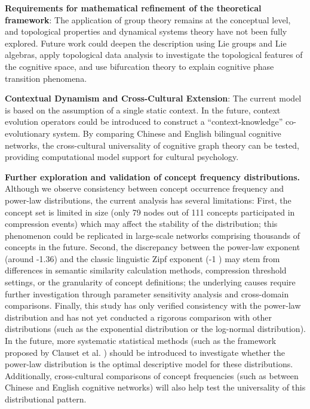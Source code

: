 \documentclass[10pt,onecolumn]{article}
\begin{document}
\textbf{Requirements for mathematical refinement of the theoretical framework}: The application of group theory remains at the conceptual level, and topological properties and dynamical systems theory have not been fully explored. Future work could deepen the description using Lie groups and Lie algebras, apply topological data analysis to investigate the topological features of the cognitive space, and use bifurcation theory to explain cognitive phase transition phenomena.

\textbf{Contextual Dynamism and Cross-Cultural Extension}: The current model is based on the assumption of a single static context. In the future, context evolution operators could be introduced to construct a “context-knowledge” co-evolutionary system. By comparing Chinese and English bilingual cognitive networks, the cross-cultural universality of cognitive graph theory can be tested, providing computational model support for cultural psychology.

\textbf{Further exploration and validation of concept frequency distributions.} Although we observe consistency between concept occurrence frequency and power-law distributions, the current analysis has several limitations: First, the concept set is limited in size (only 79 nodes out of 111 concepts participated in compression events) which may affect the stability of the distribution; this phenomenon could be replicated in large-scale networks comprising thousands of concepts in the future. Second, the discrepancy between the power-law exponent (around -1.36) and the classic linguistic Zipf exponent (-1 \citep{zipf1949human}) may stem from differences in semantic similarity calculation methods, compression threshold settings, or the granularity of concept definitions; the underlying causes require further investigation through parameter sensitivity analysis and cross-domain comparisons. Finally, this study has only verified consistency with the power-law distribution and has not yet conducted a rigorous comparison with other distributions (such as the exponential distribution or the log-normal distribution). In the future, more systematic statistical methods (such as the framework proposed by Clauset et al. \citep{clauset2009power}) should be introduced to investigate whether the power-law distribution is the optimal descriptive model for these distributions. Additionally, cross-cultural comparisons of concept frequencies (such as between Chinese and English cognitive networks) will also help test the universality of this distributional pattern.
\end{document}
